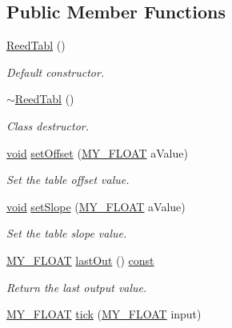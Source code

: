 \subsection*{Public Member Functions}
\begin{DoxyCompactItemize}
\item 
\hyperlink{class_reed_tabl_a74341cbbad8da87c1551c85f9f18cfa4}{Reed\+Tabl} ()
\begin{DoxyCompactList}\small\item\em Default constructor. \end{DoxyCompactList}\item 
\hyperlink{class_reed_tabl_a72412ff7b1a18c5c3218ddb2a81e3554}{$\sim$\+Reed\+Tabl} ()
\begin{DoxyCompactList}\small\item\em Class destructor. \end{DoxyCompactList}\item 
\hyperlink{sound_8c_ae35f5844602719cf66324f4de2a658b3}{void} \hyperlink{class_reed_tabl_a288b7dada78d7249bd124466f88c72cd}{set\+Offset} (\hyperlink{globals_8h_a0c8f91794b1a999fdd02c8d630184662}{M\+Y\+\_\+\+F\+L\+O\+AT} a\+Value)
\begin{DoxyCompactList}\small\item\em Set the table offset value. \end{DoxyCompactList}\item 
\hyperlink{sound_8c_ae35f5844602719cf66324f4de2a658b3}{void} \hyperlink{class_reed_tabl_acecb21d3528ae8f889f5702cddf30e7b}{set\+Slope} (\hyperlink{globals_8h_a0c8f91794b1a999fdd02c8d630184662}{M\+Y\+\_\+\+F\+L\+O\+AT} a\+Value)
\begin{DoxyCompactList}\small\item\em Set the table slope value. \end{DoxyCompactList}\item 
\hyperlink{globals_8h_a0c8f91794b1a999fdd02c8d630184662}{M\+Y\+\_\+\+F\+L\+O\+AT} \hyperlink{class_reed_tabl_aa13431006d0bf26dd7bc9755013ac8fd}{last\+Out} () \hyperlink{getopt1_8c_a2c212835823e3c54a8ab6d95c652660e}{const} 
\begin{DoxyCompactList}\small\item\em Return the last output value. \end{DoxyCompactList}\item 
\hyperlink{globals_8h_a0c8f91794b1a999fdd02c8d630184662}{M\+Y\+\_\+\+F\+L\+O\+AT} \hyperlink{class_reed_tabl_aa37d20f22867d22f285a864be8efcac0}{tick} (\hyperlink{globals_8h_a0c8f91794b1a999fdd02c8d630184662}{M\+Y\+\_\+\+F\+L\+O\+AT} input)

\end{DoxyCompactItemize}
